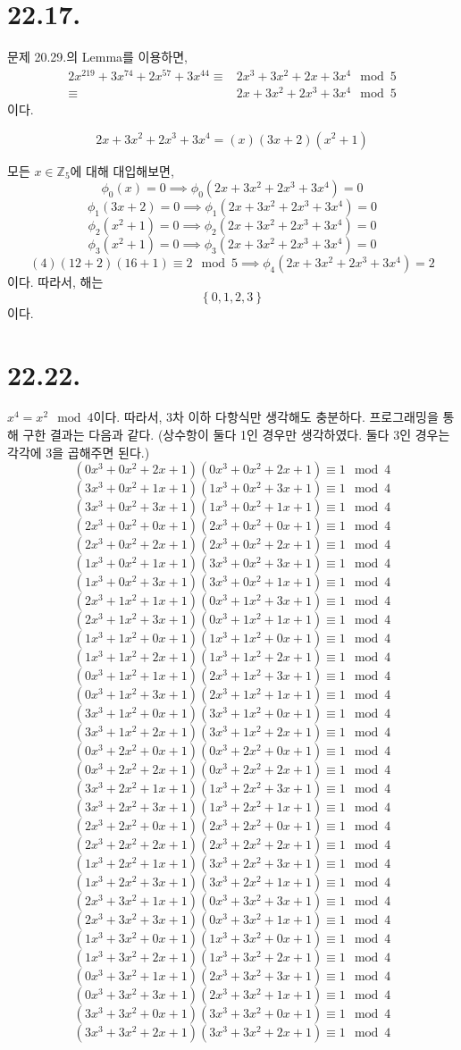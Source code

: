 \documentclass{article}
\begin{document}
\section{22.17.}
문제 20.29.의 Lemma를 이용하면,
\begin{align*}
2x^{219}+3x^{74}+2x^{57}+3x^{44} \equiv& 2x^{3}+3x^{2}+2x+3x^{4} \mod 5
\\  \equiv& 2x+3x^{2}+2x^{3}+3x^{4} \mod 5
\end{align*}
이다.

$$2x+3x^{2}+2x^{3}+3x^{4} = (x)(3x+2)(x^2 + 1)$$

모든 $x \in \mathbb{Z}_5$에 대해 대입해보면,
$$\phi_0(x) = 0 \implies \phi_0(2x+3x^{2}+2x^{3}+3x^{4}) = 0$$
$$\phi_1(3x+2) = 0 \implies \phi_1(2x+3x^{2}+2x^{3}+3x^{4}) = 0$$
$$\phi_2(x^2+1) = 0 \implies \phi_2(2x+3x^{2}+2x^{3}+3x^{4}) = 0$$
$$\phi_3(x^2+1) = 0 \implies \phi_3(2x+3x^{2}+2x^{3}+3x^{4}) = 0$$
$$(4)(12+2)(16+1) \equiv 2 \mod 5 \implies \phi_4(2x+3x^{2}+2x^{3}+3x^{4}) = 2$$
이다. 따라서, 해는 
$$\left\{0, 1, 2, 3\right\}$$
이다.

\section{22.22.}
$x^4 = x^2 \mod 4$이다. 따라서, $3$차 이하 다항식만 생각해도 충분하다. 프로그래밍을 통해 구한 결과는 다음과 같다. (상수항이 둘다 1인 경우만 생각하였다. 둘다 3인 경우는 각각에 3을 곱해주면 된다.)
$$(0x^3+0x^2+2x+1)(0x^3+0x^2+2x+1) \equiv 1 \mod 4$$
$$(3x^3+0x^2+1x+1)(1x^3+0x^2+3x+1) \equiv 1 \mod 4$$
$$(3x^3+0x^2+3x+1)(1x^3+0x^2+1x+1) \equiv 1 \mod 4$$
$$(2x^3+0x^2+0x+1)(2x^3+0x^2+0x+1) \equiv 1 \mod 4$$
$$(2x^3+0x^2+2x+1)(2x^3+0x^2+2x+1) \equiv 1 \mod 4$$
$$(1x^3+0x^2+1x+1)(3x^3+0x^2+3x+1) \equiv 1 \mod 4$$
$$(1x^3+0x^2+3x+1)(3x^3+0x^2+1x+1) \equiv 1 \mod 4$$
$$(2x^3+1x^2+1x+1)(0x^3+1x^2+3x+1) \equiv 1 \mod 4$$
$$(2x^3+1x^2+3x+1)(0x^3+1x^2+1x+1) \equiv 1 \mod 4$$
$$(1x^3+1x^2+0x+1)(1x^3+1x^2+0x+1) \equiv 1 \mod 4$$
$$(1x^3+1x^2+2x+1)(1x^3+1x^2+2x+1) \equiv 1 \mod 4$$
$$(0x^3+1x^2+1x+1)(2x^3+1x^2+3x+1) \equiv 1 \mod 4$$
$$(0x^3+1x^2+3x+1)(2x^3+1x^2+1x+1) \equiv 1 \mod 4$$
$$(3x^3+1x^2+0x+1)(3x^3+1x^2+0x+1) \equiv 1 \mod 4$$
$$(3x^3+1x^2+2x+1)(3x^3+1x^2+2x+1) \equiv 1 \mod 4$$
$$(0x^3+2x^2+0x+1)(0x^3+2x^2+0x+1) \equiv 1 \mod 4$$
$$(0x^3+2x^2+2x+1)(0x^3+2x^2+2x+1) \equiv 1 \mod 4$$
$$(3x^3+2x^2+1x+1)(1x^3+2x^2+3x+1) \equiv 1 \mod 4$$
$$(3x^3+2x^2+3x+1)(1x^3+2x^2+1x+1) \equiv 1 \mod 4$$
$$(2x^3+2x^2+0x+1)(2x^3+2x^2+0x+1) \equiv 1 \mod 4$$
$$(2x^3+2x^2+2x+1)(2x^3+2x^2+2x+1) \equiv 1 \mod 4$$
$$(1x^3+2x^2+1x+1)(3x^3+2x^2+3x+1) \equiv 1 \mod 4$$
$$(1x^3+2x^2+3x+1)(3x^3+2x^2+1x+1) \equiv 1 \mod 4$$
$$(2x^3+3x^2+1x+1)(0x^3+3x^2+3x+1) \equiv 1 \mod 4$$
$$(2x^3+3x^2+3x+1)(0x^3+3x^2+1x+1) \equiv 1 \mod 4$$
$$(1x^3+3x^2+0x+1)(1x^3+3x^2+0x+1) \equiv 1 \mod 4$$
$$(1x^3+3x^2+2x+1)(1x^3+3x^2+2x+1) \equiv 1 \mod 4$$
$$(0x^3+3x^2+1x+1)(2x^3+3x^2+3x+1) \equiv 1 \mod 4$$
$$(0x^3+3x^2+3x+1)(2x^3+3x^2+1x+1) \equiv 1 \mod 4$$
$$(3x^3+3x^2+0x+1)(3x^3+3x^2+0x+1) \equiv 1 \mod 4$$
$$(3x^3+3x^2+2x+1)(3x^3+3x^2+2x+1) \equiv 1 \mod 4$$
\end{document}
